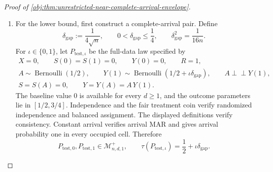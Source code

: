 \begin{proof}[Proof of \cref{obj:thm:unrestricted-near-complete-arrival-envelope}]
\begin{enumerate}
Outcome consistency, randomized independence, and balanced assignment give
\[
\begin{aligned}
P(A=a,Y=1)
&=P(A=a,Y(a)=1)\\
&=P(A=a)P(Y(a)=1)
=\frac12P(Y(a)=1).
\end{aligned}
\]
Using the observed-record map and partitioning the outcome-one event according to arrival, we obtain
\[
\begin{aligned}
E_P[\xi_{\mathrm{obs}}(O_1)]
&=
2P(A=1,R=1,Y=1)-2P(A=0,R=1,Y=1)\\
&=
2P(A=1,Y=1)-2P(A=0,Y=1)
-\Delta_1(P)+\Delta_0(P)\\
&=\tau(P)-\Delta_1(P)+\Delta_0(P).
\end{aligned}
\]
The bounds on the two deficits imply
\[
-(1-q)
\le
E_P[\xi_{\mathrm{obs}}(O_1)]-\tau(P)
\le1-q,
\]
and hence, since \(1-q\ge0\),
\[
\left(E_P[\xi_{\mathrm{obs}}(O_1)]-\tau(P)\right)^2
\le(1-q)^2.
\]
Together with the preceding variance and clipping bounds, this gives
\[
\begin{aligned}
E_P\!\left[
\left(\widehat\tau^{\mathrm{HT}}_n(\mathbf O_n)-\tau(P)\right)^2
\right]
&\le
E_P\!\left[
\left(\overline\xi_n(\mathbf O_n)-\tau(P)\right)^2
\right]\\
&\le\frac4n+(1-q)^2.
\end{aligned}
\]
The clipped contrast is measurable on the finite sample space and takes values in \([-1,1]\). Since \(4/n+(1-q)^2\ge0\), the deterministic comparison gives both
\[
\mathfrak R^{+}_{n,d,q}\le\frac4n+(1-q)^2
\]
and
\[
\sup_{P\in\mathcal M^{+}_{n,d,q}}
E_P\!\left[
\left(\widehat\tau^{\mathrm{HT}}_n(\mathbf O_n)-\tau(P)\right)^2
\right]
\le\frac4n+(1-q)^2.
\]

\item For the lower bound, first construct a complete-arrival pair. Define
\[
\delta_{\mathrm{gap}}:=\frac1{4\sqrt n},
\qquad
0<\delta_{\mathrm{gap}}\le\frac14,
\qquad
\delta_{\mathrm{gap}}^2=\frac1{16n}.
\]
For \(\iota\in\{0,1\}\), let \(P_{\mathrm{test},\iota}\) be the full-data law specified by
\[
\begin{gathered}
X=0,\qquad S(0)=S(1)=0,\qquad Y(0)=0,\qquad R=1,\\
A\sim\operatorname{Bernoulli}(1/2),\qquad
Y(1)\sim\operatorname{Bernoulli}(1/2+\iota\delta_{\mathrm{gap}}),
\qquad A\perp\!\!\!\perp Y(1),\\
S=S(A)=0,\qquad Y=Y(A)=A\,Y(1).
\end{gathered}
\]
The baseline value \(0\) is available for every \(d\ge1\), and the outcome parameters lie in \([1/2,3/4]\). Independence and the fair treatment coin verify randomized independence and balanced assignment. The displayed definitions verify consistency. Constant arrival verifies arrival MAR and gives arrival probability one in every occupied cell. Therefore
\[
P_{\mathrm{test},0},P_{\mathrm{test},1}
\in\mathcal M^{+}_{n,d,1},
\qquad
\tau(P_{\mathrm{test},\iota})
=\frac12+\iota\delta_{\mathrm{gap}}.
\]


\end{enumerate}
\end{proof}
